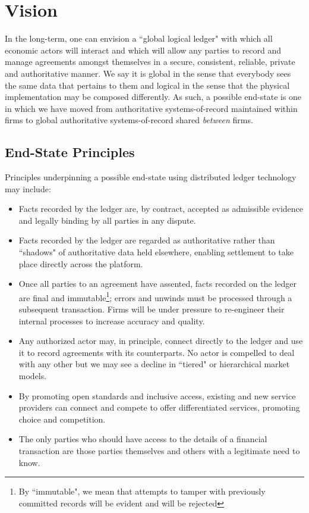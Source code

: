 \documentclass{article}
\begin{document}
\section{Vision}
In the long-term, one can envision a ``global logical ledger" with which all economic actors will interact and which will allow any parties to record and manage agreements amongst themselves in a secure, consistent, reliable, private and authoritative manner. We say it is global in the sense that everybody sees the same data that pertains to them and logical in the sense that the physical implementation may be composed differently. As such, a possible end-state is one in which we have moved from authoritative systems-of-record maintained within firms to global authoritative systems-of-record shared \textit{between} firms. 

\subsection{End-State Principles}
Principles underpinning a possible end-state using distributed ledger technology may include:
\begin{itemize}
	\item Facts recorded by the ledger are, by contract, accepted as admissible evidence and legally binding by all parties in any dispute.
	\item Facts recorded by the ledger are regarded as authoritative rather than ``shadows" of authoritative data held elsewhere, enabling settlement to take place directly across the platform.
	\item Once all parties to an agreement have assented, facts recorded on the ledger are final and immutable\footnote{By ``immutable", we mean that attempts to tamper with previously committed records will be evident and will be rejected}; errors and unwinds must be processed through a subsequent transaction. Firms will be under pressure to re-engineer their internal processes to increase accuracy and quality.
	\item Any authorized actor may, in principle, connect directly to the ledger and use it to record agreements with its counterparts. No actor is compelled to deal with any other but we may see a decline in ``tiered" or hierarchical market models. 
	\item By promoting open standards and inclusive access, existing and new service providers can connect and compete to offer differentiated services, promoting choice and competition.
	\item The only parties who should have access to the details of a financial transaction are those parties themselves and others with a legitimate need to know.
\end{itemize}
\end{document}
